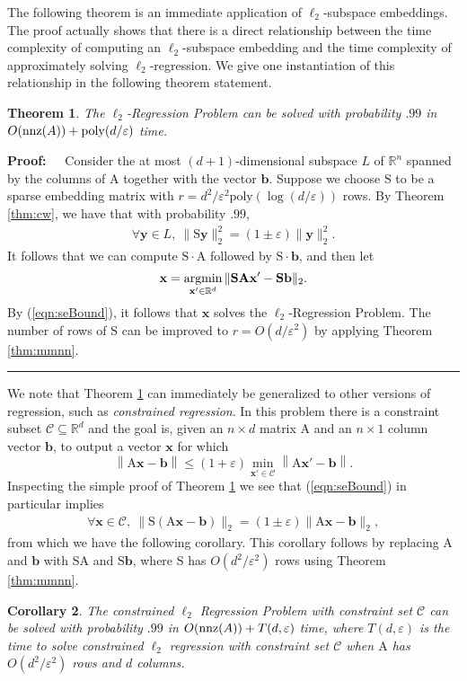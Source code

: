 \documentclass[11pt]{article}
\newtheorem{theorem}{Theorem}
\newtheorem{corollary}[theorem]{Corollary}
\newenvironment{proof}{\begin{trivlist} \item {\bf Proof:~~}}
  {\qed\end{trivlist}}
\newcommand{\mat}[1]{{\ensuremath{\bm{\mathrm{#1}}}}}
\def\b{{\mathbf b}}
\def\matA{\mat{A}}
\def\matS{\mat{S}}
\def\nnz{{ \rm nnz }}
\def\qed{\hfill\rule{2mm}{2mm}}
\def\argmin{\mathop{\hbox{argmin}}\limits}
\def\x{{\mathbf x}}
\def\y{{\mathbf y}}
\def\b{{\mathbf b}}
\def\norm#1{{\left\|#1\right\|}}
\newcommand{\eps}{\varepsilon}
\newcommand{\poly}{{\mathrm{poly}}}
\begin{document}
The following theorem is an immediate application of $\ell_2$-subspace embeddings. The proof actually shows
that there is a direct relationship between the time complexity of computing an $\ell_2$-subspace embedding 
and the time complexity of approximately solving $\ell_2$-regression. We give one instantiation of this relationship 
in the following theorem statement.
\begin{theorem}\label{thm:regression}
The $\ell_2$-Regression Problem can be solved with probability $.99$ in $O(\nnz(A)) + \poly(d/\eps)$ time.
\end{theorem}
\begin{proof}
Consider the at most $(d+1)$-dimensional subspace $L$ of $\mathbb{R}^n$ spanned by the columns of $\matA$ 
together with the vector $\b$. Suppose we choose $\matS$ to be a sparse embedding matrix with $r = d^2/\eps^2 \poly(\log(d/\eps))$ rows.
By Theorem \ref{thm:cw}, we have that with probability $.99$, 
\begin{eqnarray}\label{eqn:seBound}
\forall \y \in L, \ \|\matS\y\|_2^2 = (1 \pm \eps)\|\y\|_2^2.
\end{eqnarray}
It follows that we can compute $\matS \cdot \matA$ followed by $\matS \cdot \b$, and then let
$$\x = \argmin_{\x' \in \mathbb{R}^d} \|\matS \matA\x' - \matS \b\|_2.$$
By (\ref{eqn:seBound}), it follows that $\x$ solves the $\ell_2$-Regression Problem. The number of rows
of $\matS$ can be improved to $r = O(d/\eps^2)$ by applying Theorem \ref{thm:mmnn}. 
\end{proof}

We note that Theorem \ref{thm:regression} can immediately be generalized to other versions of regression,
such as {\it constrained regression}. In this problem there is a constraint subset $\mathcal{C} \subseteq \mathbb{R}^d$
and the goal is, given an $n \times d$ matrix $\matA$ and an $n \times 1$ column vector $\b$, to output a vector $\x$
for which
$$\norm{\matA\x-\b} \leq (1+\eps)\min_{\x' \in \mathcal{C}}\norm{\matA\x'-\b}.$$
Inspecting the simple proof of Theorem \ref{thm:regression} we see that (\ref{eqn:seBound}) in particular implies
\begin{eqnarray}\label{eqn:seConstraint}
\forall \x \in \mathcal{C}, \ \|\matS(\matA\x - \b)\|_2 = (1 \pm \eps)\|\matA \x -\b\|_2,
\end{eqnarray}
from which we have the following corollary. This corollary follows by replacing $\matA$ and $\b$
with $\matS\matA$ and $\matS\b$, where $\matS$ has $O(d^2/\eps^2)$ rows using Theorem \ref{thm:mmnn}. 
\begin{corollary}\label{cor:regression}
The constrained $\ell_2$ Regression Problem with constraint set $\mathcal{C}$
can be solved with probability $.99$ in $O(\nnz(A)) + T(d,\eps)$ time, 
where $T(d,\eps)$ is the time to solve constrained $\ell_2$ regression with constraint set $\mathcal{C}$ when $\matA$
has $O(d^2/\eps^2)$ rows and $d$ columns. 
\end{corollary}
\end{document}
